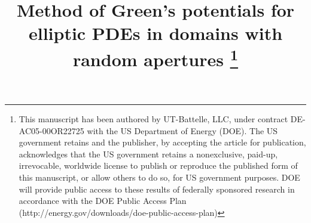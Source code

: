 \usepackage{graphicx}

\graphicspath{ {./images/} }

\newcommand{\E}[2][]{\mathbb{E}_{{#1}} \left[ {#2} \right] }
\newcommand{\EMC}[2][]{\mathbb{E_{MC}}_{{#1}} \left[ {#2} \right] }
\newcommand{\EML}[2][]{\mathbb{E_{ML}}_{{#1}} \left[ {#2} \right] }
\newcommand{\dE}[2][]{\left( \mathbb{E}_{{#1}} - \mathbb{E_{ML}}_{{#1}} \right) \left[ {#2} \right] }
\newcommand{\dEML}[2][]{\big( \mathbb{E_{ML}}_{{#1}} - \mathbb{E}_{{#1}} \big) \left[ {#2} \right] }
\newcommand{\dEMC}[2][]{\big( \mathbb{E_{MC}}_{{#1}} - \mathbb{E}_{{#1}} \big) \left[ {#2} \right] }
\newcommand{\Var}[2][]{\mathbb{V}ar_{{#1}} \left[ {#2} \right] }
\newcommand{\Cov}[2][]{\mathbb{C}ov_{{#1}} \left[ {#2} \right] }
\newcommand{\Prob}[2][]{\mathbb{P}_{{#1}} \left[ {#2} \right] }
\newcommand{\norm}[2]{ \left\| #1 \right\|_{#2} }
\newcommand{\change}[1]{#1}

\DeclareMathOperator{\Tr}{Tr}
\DeclareMathOperator*{\argmin}{arg\,min}

\newtheorem{Assumption}{Assumption}
\newtheorem{Theorem}{Theorem}
\newtheorem{Example}{Example}
\newtheorem{Problem}{Problem}
\newtheorem{Definition}{Definition}
\newtheorem{Lemma}{Lemma}

\everymath{\displaystyle}




\title{Method of Green's potentials for elliptic PDEs in domains with random \change{apertures} \thanks{This manuscript has been authored by UT-Battelle, LLC, under contract DE-AC05-00OR22725 with the US Department of Energy (DOE). The US government retains and the publisher, by accepting the article for publication, acknowledges that the US government retains a nonexclusive, paid-up, irrevocable, worldwide license to publish or reproduce the published form of this manuscript, or allow others to do so, for US government purposes. DOE will provide public access to these results of federally sponsored research in accordance with the DOE Public Access Plan (http://energy.gov/downloads/doe-public-access-plan)} }

